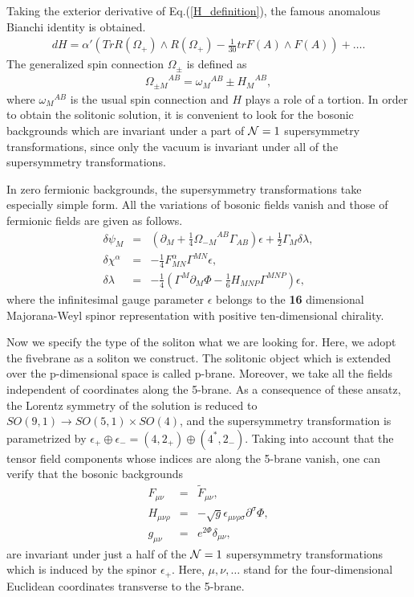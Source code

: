 \documentclass[a4paper,aps, amssymb, preprint, 12pt]{revtex4}
\begin{document}
Taking the exterior derivative of Eq.(\ref{H_definition}), the famous anomalous Bianchi identity is obtained.
\begin{eqnarray}
dH= \alpha'\left(TrR(\Omega_{+})\wedge R(\Omega_{+})- \frac{1}{30} trF(A)\wedge F(A)\right)+ \ldots. \label{anomalous_Bid}
\end{eqnarray}
The generalized spin connection $\Omega_\pm$ is defined as
\begin{eqnarray}
{\Omega_{\pm M}}^{AB}={\omega_{M}}^{AB}\pm{{H_{M}}}^{AB}, \label{definition_Omega}
\end{eqnarray}
where ${\omega_M}^{AB}$ is the usual spin connection and $H$ plays a role of a tortion.
In order to obtain the solitonic solution, it is convenient to look for the bosonic backgrounds which are invariant under a part of ${\cal N}=1$ supersymmetry transformations, since only the vacuum is invariant under all of the supersymmetry transformations.

In zero fermionic backgrounds, the supersymmetry transformations take especially simple form.
All the variations of bosonic fields vanish and those of fermionic fields are given as follows\cite{Bellisai}.
\begin{eqnarray}  %
\delta\psi_M &=& \left(\partial_M+\frac{1}{4}{\Omega_{-M}}^{AB}\Gamma_{AB}\right)\epsilon +\frac{1}{2}\Gamma_M\delta\lambda, \label{GrV}\\
\delta\chi^\alpha &=& -\frac{1}{4}F_{MN}^{\alpha}\Gamma^{MN}\epsilon, \label{GaV}\\
\delta\lambda  &=& -\frac{1}{4}\left(\Gamma^M\partial_M\Phi-\frac{1}{6}H_{MNP}\Gamma^{MNP}\right)\epsilon, \label{DlV}
\end{eqnarray}
where the infinitesimal gauge parameter $\epsilon$ belongs to the {\bf 16} dimensional Majorana-Weyl spinor representation with positive ten-dimensional chirality.

Now we specify the type of the soliton what we are looking for.
Here, we adopt the fivebrane as a soliton we construct.
The solitonic object which is extended over the p-dimensional space is called p-brane.
Moreover, we take all the fields independent of coordinates along the 5-brane.
As a consequence of these ansatz, the Lorentz symmetry of the solution is reduced to $SO(9,1) \to SO(5,1)\times SO(4)$, and the supersymmetry transformation is parametrized by $\epsilon_{+}\oplus\epsilon_{-}=(4,2_{+})\oplus(4^*,2_{-})$.
Taking into account that the tensor field components whose indices are along the 5-brane vanish, one can verify that the bosonic backgrounds 
\begin{eqnarray}   %
F_{\mu\nu} &=& \tilde{F}_{\mu\nu}, \\
H_{\mu\nu\rho} &=& -\sqrt{g}\epsilon_{\mu\nu\rho\sigma}\partial^\sigma\Phi, \label{H} \\
g_{\mu\nu} &=& e^{2\Phi}\delta_{\mu\nu}, \label{metric}
\end{eqnarray}
are invariant under just a half of the ${\cal N}=1$ supersymmetry transformations which is induced by the spinor $\epsilon_+$.
Here, $\mu,\nu,\ldots$ stand for the four-dimensional Euclidean coordinates transverse to the 5-brane.
\end{document}
